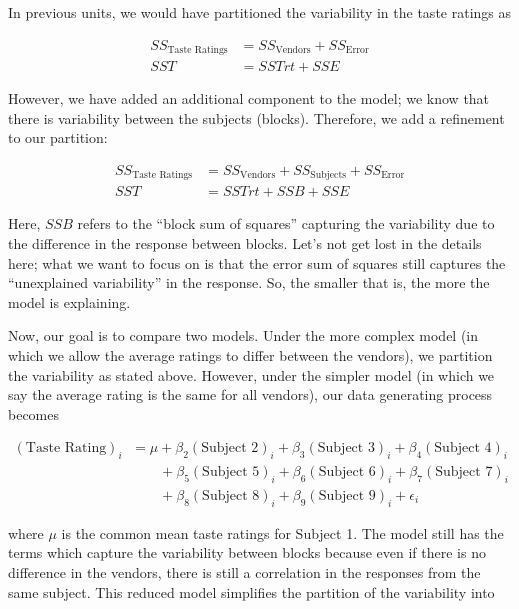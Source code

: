 \documentclass[
]{book}
\theoremstyle{plain}
\theoremstyle{mydefn}
\theoremstyle{myexmpl}
\theoremstyle{remark}
\begin{document}
In previous units, we would have partitioned the variability in the taste ratings as

\[
\begin{aligned}
  SS_{\text{Taste Ratings}} &= SS_{\text{Vendors}} + SS_{\text{Error}} \\
  SST &= SSTrt + SSE
\end{aligned}
\]

However, we have added an additional component to the model; we know that there is variability between the subjects (blocks). Therefore, we add a refinement to our partition:

\[
\begin{aligned}
  SS_{\text{Taste Ratings}} &= SS_{\text{Vendors}} + SS_{\text{Subjects}} + SS_{\text{Error}} \\
  SST &= SSTrt + SSB + SSE
\end{aligned}
\]

Here, \(SSB\) refers to the ``block sum of squares'' capturing the variability due to the difference in the response between blocks. Let's not get lost in the details here; what we want to focus on is that the error sum of squares still captures the ``unexplained variability'' in the response. So, the smaller that is, the more the model is explaining.

Now, our goal is to compare two models. Under the more complex model (in which we allow the average ratings to differ between the vendors), we partition the variability as stated above. However, under the simpler model (in which we say the average rating is the same for all vendors), our data generating process becomes

\[
\begin{aligned}
  (\text{Taste Rating})_i &= \mu + \beta_2 (\text{Subject 2})_i + \beta_3 (\text{Subject 3})_i + \beta_4 (\text{Subject 4})_i \\
    &\qquad + \beta_5 (\text{Subject 5})_i + \beta_6 (\text{Subject 6})_i + \beta_7 (\text{Subject 7})_i \\
    &\qquad + \beta_8 (\text{Subject 8})_i + \beta_9 (\text{Subject 9})_i + \epsilon_i
\end{aligned}
\]

where \(\mu\) is the common mean taste ratings for Subject 1. The model still has the terms which capture the variability between blocks because even if there is no difference in the vendors, there is still a correlation in the responses from the same subject. This reduced model simplifies the partition of the variability into
\end{document}
